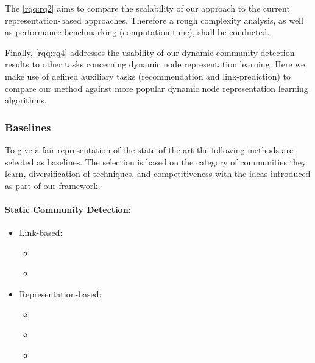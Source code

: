 \documentclass[
acmsmall,
nonacm,
screen,
acmthm]{../../scripts/pandoc/templates/acmart}
\providecommand{\tightlist}{%
\setlength{\itemsep}{0pt}\setlength{\parskip}{0pt}}
\begin{document}
The \cref{rqq:rq2} aims to compare the scalability of our approach to
the current representation-based approaches. Therefore a rough
complexity analysis, as well as performance benchmarking (computation
time), shall be conducted.

Finally, \cref{rqq:rq4} addresses the usability of our dynamic community
detection results to other tasks concerning dynamic node representation
learning. Here we, make use of defined auxiliary tasks (recommendation
and link-prediction) to compare our method against more popular dynamic
node representation learning algorithms.

\hypertarget{baselines}{%
\subsubsection{Baselines}\label{baselines}}

To give a fair representation of the state-of-the-art the following
methods are selected as baselines. The selection is based on the
category of communities they learn, diversification of techniques, and
competitiveness with the ideas introduced as part of our framework.

\hypertarget{static-community-detection}{%
\paragraph{Static Community
Detection:}\label{static-community-detection}}

\begin{itemize}
\tightlist
\item
  Link-based:

  \begin{itemize}
  \tightlist
  \item
    \citet{heFastAlgorithmCommunity2015}
  \item
    \citet{rossettiANGELEfficientEffective2020}
  \end{itemize}
\item
  Representation-based:

  \begin{itemize}
  \tightlist
  \item
    \citet{rozemberczkiGEMSECGraphEmbedding2019}~~~~
  \item
    \citet{cavallariLearningCommunityEmbedding2017}
  \item
    \citet{jiaCommunityGANCommunityDetection2019}
  \end{itemize}
\end{itemize}
\end{document}
